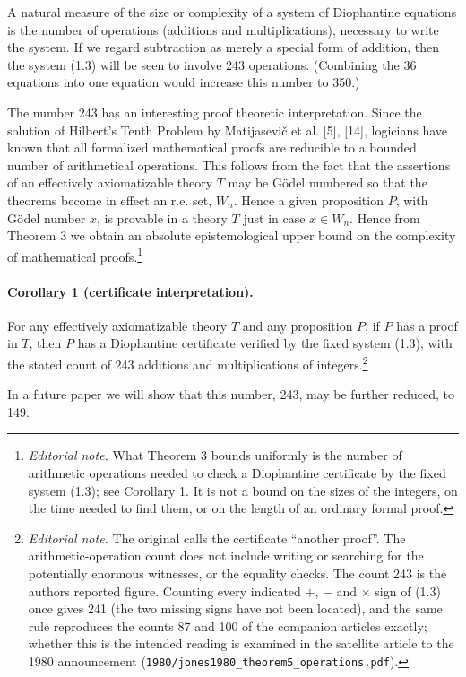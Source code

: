 \documentclass[11pt,a4paper]{article}
\newcommand{\ednote}[1]{\footnote{\textit{Editorial note.} #1}}
\begin{document}
A natural measure of the size or complexity of a system of Diophantine equations is the number of operations (additions and multiplications), necessary to write the system. If we regard subtraction as merely a special form of addition, then the system (1.3) will be seen to involve 243 operations. (Combining the 36 equations into one equation would increase this number to 350.)

The number 243 has an interesting proof theoretic interpretation. Since the solution of Hilbert's Tenth Problem by Matijasevič et al. [5], [14], logicians have known that all formalized mathematical proofs are reducible to a bounded number of arithmetical operations. This follows from the fact that the assertions of an effectively axiomatizable theory $T$ may be Gödel numbered so that the theorems become in effect an r.e. set, $W_{n}$. Hence a given proposition $P$, with Gödel number $x$, is provable in a theory $T$ just in case $x \in W_{n}$. Hence from Theorem 3 we obtain an absolute epistemological upper bound on the complexity of mathematical proofs.\ednote{What Theorem 3 bounds uniformly is the number of arithmetic operations needed to check a Diophantine certificate by the fixed system (1.3); see Corollary 1. It is not a bound on the sizes of the integers, on the time needed to find them, or on the length of an ordinary formal proof.}

\paragraph{Corollary 1 (certificate interpretation).} For any effectively axiomatizable theory $T$ and any proposition $P$, if $P$ has a proof in $T$, then $P$ has a Diophantine certificate verified by the fixed system (1.3), with the stated count of 243 additions and multiplications of integers.\ednote{The original calls the certificate ``another proof''. The arithmetic-operation count does not include writing or searching for the potentially enormous witnesses, or the equality checks. The count 243 is the author\textquotesingle s reported figure. Counting every indicated $+$, $-$ and $\times$ sign of (1.3) once gives 241 (the two missing signs have not been located), and the same rule reproduces the counts 87 and 100 of the companion articles exactly; whether this is the intended reading is examined in the satellite article to the 1980 announcement (\texttt{1980/jones1980\_theorem5\_operations.pdf}).}

In a future paper we will show that this number, 243, may be further reduced, to 149.
\end{document}

